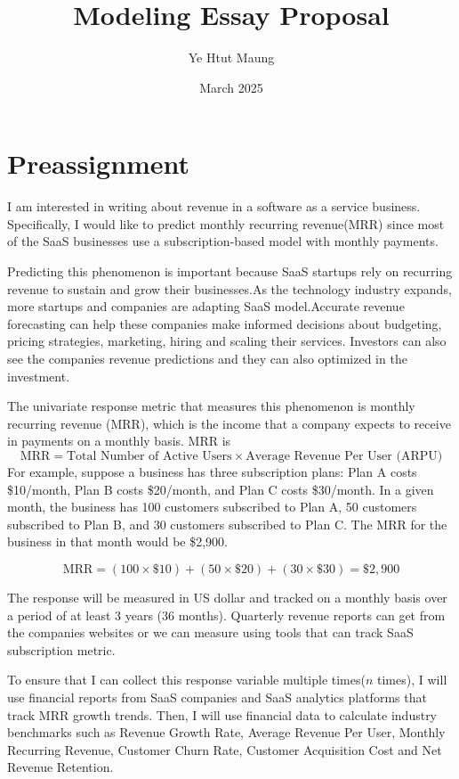 \documentclass{article}
\title{Modeling Essay Proposal}
\author{Ye Htut Maung}
\date{March 2025}
\begin{document}
\maketitle

\section{Preassignment}


I am interested in writing about revenue in a software as a service business. Specifically, I would like to predict monthly recurring revenue(MRR) since most of the SaaS businesses use a subscription-based model with monthly payments.

Predicting this phenomenon is important because SaaS startups rely on recurring revenue to sustain and grow their businesses.As the technology industry expands, more startups and companies are adapting SaaS model.Accurate revenue forecasting can help these companies make informed decisions about budgeting, pricing strategies, marketing, hiring and scaling their services. Investors can also see the companies revenue predictions and they can also optimized in the investment.

The univariate response metric that measures this phenomenon is monthly recurring revenue (MRR), which is the income that a company expects to receive in payments on a monthly basis. MRR is
\[
\text{MRR} = \text{Total Number of Active Users} \times \text{Average Revenue Per User (ARPU)}
\]
For example, suppose a business has three subscription plans: Plan A costs \$10/month, Plan B costs \$20/month, and Plan C costs \$30/month. In a given month, the business has 100 customers subscribed to Plan A, 50 customers subscribed to Plan B, and 30 customers subscribed to Plan C. The MRR for the business in that month would be \$2,900.

\[
\text{MRR} = (100 \times \$10) + (50 \times \$20) + (30 \times \$30) = \$2,900
\]


The response will be measured in US dollar and tracked on a monthly basis over a period of at least 3 years (36 months). Quarterly revenue reports can get from the companies websites or we can measure using tools that can track SaaS subscription metric. 

To ensure that I can collect this response variable multiple times($n$ times), I will use financial reports from SaaS companies and SaaS analytics platforms that track MRR growth trends. Then, I will use financial data to calculate industry benchmarks such as Revenue Growth Rate, Average Revenue Per User, Monthly Recurring Revenue, Customer Churn Rate, Customer Acquisition Cost and Net Revenue Retention.
\end{document}
